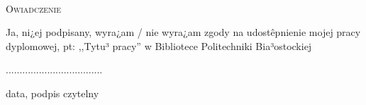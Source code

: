 \documentclass[magisterium,10pt, oneside]{wipb}
\begin{document}

\maketitle

\tableofcontents
\thispagestyle{empty}

\setcounter{page}{0}





\lstlistoflistings
\thispagestyle{empty}

\listoffigures
\listoftables

\pagebreak
\pagestyle{empty}
~\\ \vspace{2cm}
\begin{center}
{\Large    \textsc{Owiadczenie}}
\end{center}
\vspace{2cm}
Ja, ni¿ej podpisany, wyra¿am / nie wyra¿am zgody na udostêpnienie mojej pracy dyplomowej,  pt: ,,Tytu³  pracy''
w Bibliotece  Politechniki Bia³ostockiej



\begin{flushright}
...................................

data,  podpis czytelny 
\end{flushright}
\end{document}
